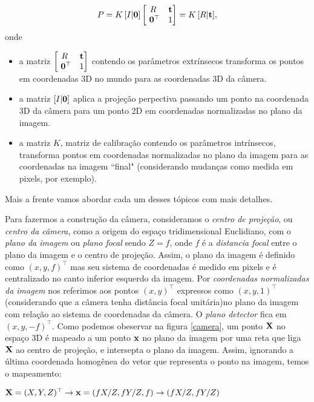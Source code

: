 \begin{equation*}
P = K \, [I|{\bf 0}]
\begin{bmatrix}
R&{\bf t}\\
\,\,{\bf 0}^\top &1
\end{bmatrix}
= K\,[R|{\bf t}],
\end{equation*}
onde 

\begin{itemize}
\item a matriz $\begin{bmatrix}
R&{\bf t}\\
\,\,{\bf 0}^\top &1
\end{bmatrix}$
contendo os parâmetros extrínsecos transforma os pontos em coordenadas 3D no mundo para as coordenadas 3D da câmera.
\item a matriz $[I|{\bf 0}]$ aplica a projeção perpectiva passando um ponto na coordenada 3D da câmera para um ponto 2D em coordenadas normalizadas no plano da imagem.
\item a matriz $K$, matriz de calibração contendo os parâmetros intrínsecos, transforma pontos em coordenadas normalizadas no plano da imagem para as coordenadas na imagem ``final" (considerando mudanças como medida em pixels, por exemplo).  
\end{itemize}
Mais a frente vamos abordar cada um desses tópicos com mais detalhes.

Para fazermos a construção da câmera, consideramos o \textit{centro de projeção}, ou \textit{centro da câmera}, como a origem do espaço tridimensional Euclidiano, com o \textit{plano da imagem} ou \textit{plano focal} sendo $Z = f$, onde $f$ é a \textit{distancia focal} entre o plano da imagem e o centro de projeção. Assim, o plano da imagem é definido como $(x,y,f)^\top$ mas seu sistema de coordenadas é medido em pixels e é centralizado no canto inferior esquerdo da imagem. Por \textit{coordenadas normalizadas da imagem} nos referimos aos pontos $(x,y)^\top$ expressos como $(x,y,1)^\top$ (considerando que a câmera tenha distância focal unitária)no plano da imagem com relação ao sistema de coordenadas da câmera. O \textit{plano detector} fica em $(x,y,-f)^\top$. Como podemos obeservar na figura \ref{camera}, um ponto $\mathbf{X}$ no espaço 3D é mapeado a um ponto $\mathbf{x}$ no plano da imagem por uma reta que liga $\mathbf{X}$ ao centro de projeção, e intersepta o plano da imagem. Assim, ignorando a última coordenada homogênea do vetor que representa o ponto na imagem, temos o mapeamento:

\begin{center}
$\mathbf{X} = (X,Y,Z)^\top \rightarrow \mathbf{x} = (fX/Z,fY/Z,f) \rightarrow (fX/Z,fY/Z)$  
\end{center}

